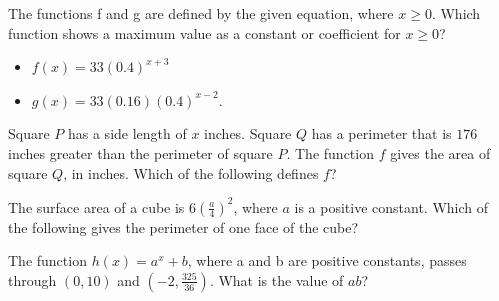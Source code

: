 \vspace{2em}

\noindent\markforreview
\vspace{1em}
The functions f and g are defined by the given equation, where $ x \geq0$. Which function shows a maximum value as a constant or coefficient for $x \geq 0$?

\begin{itemize}
    \item[I]  $f(x) = 33(0.4)^{x + 3}$ 
 
\item[II] $g(x) = 33(0.16)(0.4)^{x - 2}$. 
\end{itemize}

\vspace{0.75em}


\newpage
\noindent\markforreview
\vspace{1em}

Square $P$ has a side length of $x$ inches. Square $Q$ has a perimeter that is  $176$ inches greater than the perimeter of square $P$.  
The function $f$ gives the area of square $Q$, in inches. Which of the following defines $f$?

\vspace{0.75em}


\vspace{2em}

\noindent\markforreview
\vspace{1em}

The surface area of a cube is $6\left(\frac{a}{4}\right)^2$, where $a$ is a positive constant.  
Which of the following gives the perimeter of one face of the cube?

\vspace{0.75em}


\newpage

\noindent\markforreview
\vspace{1em}

The function $h(x) = a^x + b$, where a and b are positive constants, passes through $(0, 10)$ and $(-2, \frac{325}{36})$.  
What is the value of $ab$?

